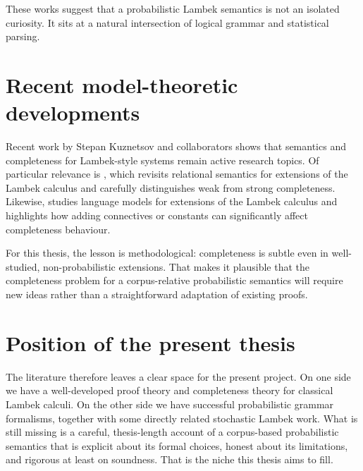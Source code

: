 These works suggest that a probabilistic Lambek semantics is not an isolated curiosity. It sits at
a natural intersection of logical grammar and statistical parsing.


\section{Recent model-theoretic developments}
Recent work by Stepan Kuznetsov and collaborators shows that semantics and completeness for
Lambek-style systems remain active research topics. Of particular relevance is
\citet{Kuznetsov2023}, which revisits relational semantics for extensions of the Lambek calculus
and carefully distinguishes weak from strong completeness. Likewise,
\citet{KanovichKuznetsovScedrov2022} studies language models for extensions of the Lambek
calculus and highlights how adding connectives or constants can significantly affect completeness
behaviour.

For this thesis, the lesson is methodological: completeness is subtle even in well-studied,
non-probabilistic extensions. That makes it plausible that the completeness problem for a
corpus-relative probabilistic semantics will require new ideas rather than a straightforward
adaptation of existing proofs.


\section{Position of the present thesis}
The literature therefore leaves a clear space for the present project. On one side we have a
well-developed proof theory and completeness theory for classical Lambek calculi. On the other
side we have successful probabilistic grammar formalisms, together with some directly related
stochastic Lambek work. What is still missing is a careful, thesis-length account of a
corpus-based probabilistic semantics that is explicit about its formal choices, honest about its
limitations, and rigorous at least on soundness. That is the niche this thesis aims to fill.
